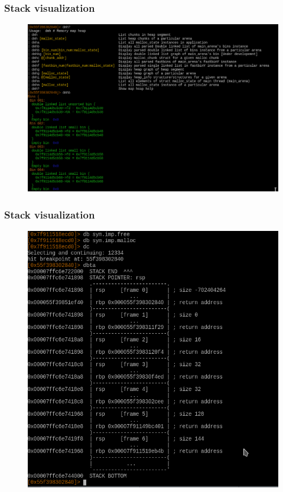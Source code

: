 \documentclass[10pt,pdf,utf8,english,compress,hyperref={unicode}]{beamer}
\begin{document}
\begin{frame}[fragile]
	\frametitle{Stack visualization}
	\begin{figure}
		\includegraphics[width=\linewidth]{r2heapbins.png}
	\end{figure}
\end{frame}

\begin{frame}[fragile]
	\frametitle{Stack visualization}
	\begin{figure}
		\includegraphics[width=\linewidth]{r2visualstack.png}
	\end{figure}
\end{frame}
\end{document}
